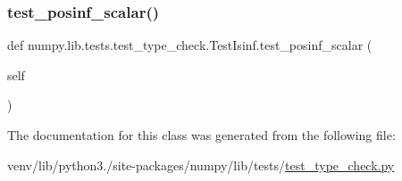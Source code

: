 \subsubsection{\texorpdfstring{test\+\_\+posinf\+\_\+scalar()}{test\_posinf\_scalar()}}
{\footnotesize\ttfamily def numpy.\+lib.\+tests.\+test\+\_\+type\+\_\+check.\+Test\+Isinf.\+test\+\_\+posinf\+\_\+scalar (\begin{DoxyParamCaption}\item[{}]{self }\end{DoxyParamCaption})}



The documentation for this class was generated from the following file\+:\begin{DoxyCompactItemize}
\item 
venv/lib/python3./site-\/packages/numpy/lib/tests/\hyperlink{test__type__check_8py}{test\+\_\+type\+\_\+check.\+py}\end{DoxyCompactItemize}
